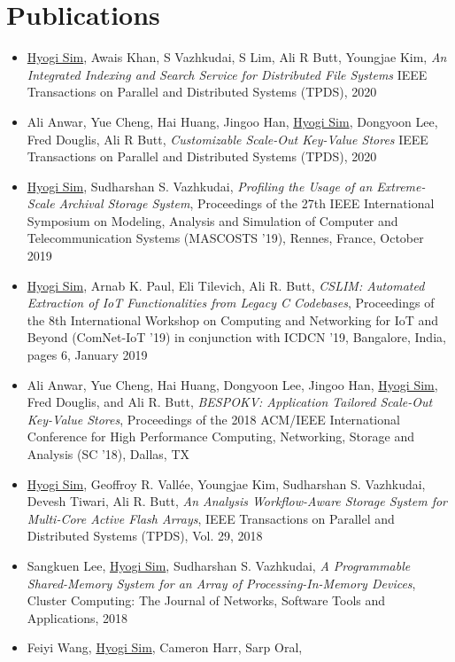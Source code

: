 \section{Publications}
\begin{itemize}
\item \underline{Hyogi Sim}, Awais Khan, S Vazhkudai, S Lim, Ali R Butt, Youngjae Kim,
  {\it An Integrated Indexing and Search Service for Distributed File Systems}
  IEEE Transactions on Parallel and Distributed Systems (TPDS), 2020
\item Ali Anwar, Yue Cheng, Hai Huang, Jingoo Han, \underline{Hyogi Sim},
      Dongyoon Lee, Fred Douglis, Ali R Butt,
  {\it Customizable Scale-Out Key-Value Stores}
  IEEE Transactions on Parallel and Distributed Systems (TPDS), 2020
\item \underline{Hyogi Sim}, Sudharshan S. Vazhkudai,
  {\it Profiling the Usage of an Extreme-Scale Archival Storage System},
  Proceedings of the 27th IEEE International Symposium on Modeling, Analysis and Simulation of Computer and Telecommunication Systems
  (MASCOSTS '19), Rennes, France, October 2019
\item \underline{Hyogi Sim}, Arnab K. Paul, Eli Tilevich, Ali R. Butt,
  {\it CSLIM: Automated Extraction of IoT Functionalities from Legacy C Codebases},
  Proceedings of the 8th International Workshop on Computing and Networking for
  IoT and Beyond (ComNet-IoT ’19) in conjunction with ICDCN '19, Bangalore,
  India, pages 6, January 2019
\item Ali Anwar, Yue Cheng, Hai Huang, Dongyoon Lee, Jingoo Han, \underline{Hyogi Sim},
  Fred Douglis, and Ali R. Butt,
  {\it BESPOKV: Application Tailored Scale-Out Key-Value Stores},
  Proceedings of the 2018 ACM/IEEE International Conference for High
  Performance Computing, Networking, Storage and Analysis (SC '18), Dallas, TX
\item \underline{Hyogi Sim}, Geoffroy R. Vall\'ee,
	Youngjae Kim, Sudharshan S. Vazhkudai, Devesh Tiwari, Ali R. Butt,
  {\it An Analysis Workflow-Aware Storage System for Multi-Core Active Flash Arrays},
  IEEE Transactions on Parallel and Distributed Systems (TPDS), Vol. 29, 2018
\item Sangkuen Lee, \underline{Hyogi Sim}, Sudharshan S. Vazhkudai,
  {\it A Programmable Shared-Memory System for an Array of Processing-In-Memory Devices},
  Cluster Computing: The Journal of Networks, Software Tools and Applications, 2018
\item Feiyi Wang, \underline{Hyogi Sim}, Cameron Harr, Sarp Oral,

\end{itemize}
